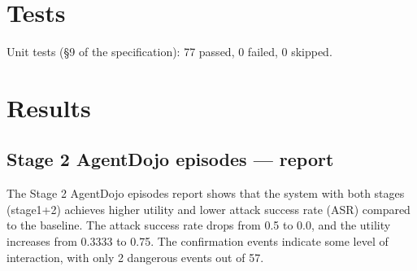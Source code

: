 \documentclass[11pt,a4paper]{article}
\begin{document}
\section{Tests}
Unit tests (§9 of the specification): 77 passed, 0 failed, 0 skipped.
\begin{table}[H]\centering\small
\caption{pytest results per file}
\end{table}
\section{Results}
\subsection{Stage 2 AgentDojo episodes — report}
\begin{table}[H]\centering\small
\caption{AgentDojo per-configuration aggregates (report); asr = attack success rate}
\end{table}
The Stage 2 AgentDojo episodes report shows that the system with both stages (stage1+2) achieves higher utility and lower attack success rate (ASR) compared to the baseline. The attack success rate drops from 0.5 to 0.0, and the utility increases from 0.3333 to 0.75. The confirmation events indicate some level of interaction, with only 2 dangerous events out of 57.
\end{document}
